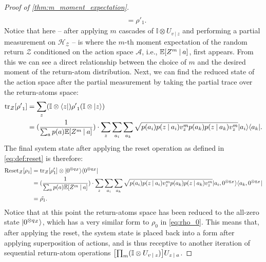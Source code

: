 \documentclass{article}
\DeclarePairedDelimiter{\bra}{\langle}{\rvert} %
\DeclarePairedDelimiter{\ket}{\lvert}{\rangle} %
\DeclarePairedDelimiter{\bparen}{[}{]} %
\newcommand{\E}{\mathbb{E}} %
\newcommand{\hilbert}{\mathcal{H}} %
\newcommand{\bfunc}[2]{#1\bparen*{#2}} %
\newcommand{\given}[1][]{\:#1\vert\:}
\begin{document}
\begin{proof}[Proof of \cref{thm:m_moment_expectation}]
\begin{align}
\\& = \rho'_1.
\end{align}
% 
Notice that here -- after applying $m$ cascades of $\mathbb{I} \otimes U_{v \given z}$ and performing a partial measurement on $\hilbert_{\mathcal{Z}}$ -- is where the $m$-th moment expectation of the random return $\mathcal{Z}$ conditioned on the action space $\mathcal{A}$, i.e., $\bfunc{\mathbb{E}}{Z^{m} \given a}$, first appears.
% 
From this we can see a direct relationship between the choice of $m$ and the desired moment of the return-atom distribution.
% 
Next, we can find the reduced state of the action space after the partial measurement by taking the partial trace over the return-atoms space:
%
\begin{align}
\bfunc{\textrm{tr}_{\mathcal{Z}}}{{\rho'}_1}
&= \sum_{z} (\mathbb{I}\otimes\bra{z}) {\rho'}_1 (\mathbb{I}\otimes\ket{z}) \\
&= (\frac{1}{\sum_{a} p(a) \bfunc{\mathbb{E}}{Z^{m} \given a}}) \cdot \sum_{z} \sum_{a_i} \sum_{a_k} \sqrt{p(a_i) p(z \given a_i) v_{z}^{m} p(a_k) p(z \given a_k) v_{z}^{m}} \ket{a_i}\bra{a_k}.
\end{align}
% 
The final system state after applying the reset operation as defined in \cref{eq:def:reset} is therefore:
%
\begin{align}
\bfunc{\textrm{Reset}_{\mathcal{Z}}}{\rho_1}
&= \bfunc{\textrm{tr}_{\mathcal{Z}}}{\rho'_1} \otimes \ket{0^{\otimes q_{\mathcal{Z}}}}\bra{0^{\otimes q_{\mathcal{Z}}}}
\\&= (\frac{1}{\sum_{a} p(a) \bfunc{\mathbb{E}}{Z^{m} \given a}}) \cdot \sum_{z} \sum_{a_i} \sum_{a_k} \sqrt{p(a_i) p(z \given a_i) v_{z}^{m} p(a_k) p(z \given a_k) v_{z}^{m}} \ket{a_i,0^{\otimes q_{\mathcal{Z}}}}\bra{a_k,0^{\otimes q_{\mathcal{Z}}}}
\\&= \tilde{\rho_1}.
\end{align}
% 
Notice that at this point the return-atoms space has been reduced to the all-zero state $\ket{0^{\otimes q_{\mathcal{Z}}}}$, which has a very similar form to $\rho_0$ in \cref{eq:rho_0}. This means that, after applying the reset, the system state is placed back into a form after applying superposition of actions, and is thus receptive to another iteration of sequential return-atom operations $\bparen*{\prod_{m} (\mathbb{I} \otimes U_{v \given z})} U_{z \given a}$.


\end{proof}
\end{document}
